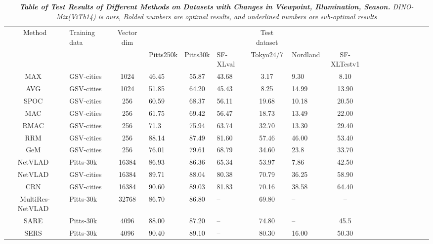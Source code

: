 \begin{table*}[h]
\renewcommand{\thetable}{3}
    \caption{\emph{\textbf{Table of Test Results of Different Methods on Datasets with Changes in Viewpoint, Illumination, Season.} DINO-Mix(ViTb14) is ours, Bolded numbers are optimal results, and underlined numbers are sub-optimal results}}
    \centering
    \begin{tabular}{c p{1.6cm} c p{0.9cm} c p{0.8cm}  c p{0.9cm}  c p{0.8cm}  c p{0.8cm} c p{0.8cm}  c p{0.8cm}  c p{0.8cm}}
    \hline
    Method & Training data & Vector dim & & & & Test dataset\\
    
    &&& Pitts250k & Pitts30k & SF-XLval & Tokyo24/7 & Nordland & SF-XLTestv1 \\
    \hline
    MAX~\cite{relja_netvlad_2018}   & GSV-cities& 1024& 46.45& 55.87 &43.68&3.17&9.30&8.10 \\
    AVG~\cite{relja_netvlad_2018} & GSV-cities& 1024 &51.85& 64.20 &45.43&8.25&14.99&13.90 \\
    SPOC~\cite{yandex_aggregating_2015}  & GSV-cities & 256 & 60.59 & 68.37 &56.11&19.68&10.18&20.50 \\
    MAC~\cite{razavian_visual_2016}  & GSV-cities  & 256 & 61.75& 69.42 &56.47&18.73&13.49&22.00 \\
    RMAC~\cite{tolias_particular_2016} & GSV-cities  & 256 & 71.3  & 75.94&63.74&32.70&13.30&29.40 \\
    RRM~\cite{kordopatis-zilos_leveraging_2021}   & GSV-cities  & 256 &88.14& 87.49&81.60&57.46&46.00&53.40 \\
    GeM~\cite{radenovic_fine-tuning_2019}  & GSV-cities  & 256  &76.01 & 79.61&68.79&34.60&23.8&33.70 \\
    NetVLAD~\cite{relja_netvlad_2018}& Pitts-30k  & 16384 & 86.93& 86.36 &65.34&53.97&7.86&42.50 \\
    NetVLAD~\cite{relja_netvlad_2018} & GSV-cities& 16384& 89.71& 88.04 &80.38&70.79&36.25&58.90 \\
    CRN~\cite{kim_learned_2017}  & GSV-cities &  16384& 90.60& 89.03&81.83&70.16&38.58&64.40 \\
    MultiRes-NetVLAD~\cite{khaliq_multires-netvlad_2022} &Pitts-30k&32768& 86.70& 86.80 &--&69.80&--&-- \\
    SARE~\cite{liu_stochastic_2019} & Pitts-30k& 4096 & 88.00&87.20&--&74.80&--&45.5 \\
    SERS~\cite{ge_self-supervising_2020} & Pitts-30k& 4096 &90.40 & 89.10 &--&80.30&16.00&50.30 \\

\end{tabular}
\end{table*}
